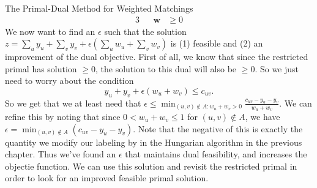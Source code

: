 \begin{section}{The Primal-Dual Method for Weighted Matchings}
\begin{alignat}{3}
				     && \mathbf{w} & \geq 0
	\end{alignat}
	We now want to find an $\epsilon$ such that the solution $z = \sum_u y_u + \sum_v y_v + 
	\epsilon (\sum_u w_u + \sum_v w_v)$ is (1) feasible and (2) an improvement of the dual 
	objective. First of all, we know that since the restricted primal has solution $\geq 0$, 
	the solution to this dual will also be $\geq 0$. So we just need to worry about the condition 
	\[
		y_u + y_v + \epsilon (w_u + w_v) \leq c_{uv}.
	\]
	So we get that we at least need that $\epsilon \leq \min_{(u,v)\notin A: w_u + w_v > 0}
	\frac{c_{uv} - y_u - y_v}{w_u + w_v}$. We can refine this by noting that since 
	$0 < w_u + w_v \leq 1$ for $(u,v)\notin A$, we have $\epsilon = \min_{(u,v)\notin A} 
	(c_{uv} - y_u - y_v)$. Note that the negative of this is exactly the quantity we modify our 
	labeling by in the Hungarian algorithm in the previous chapter. Thus we've found an 
	$\epsilon$ that maintains dual feasibility, and increases the objectie function. We can use 
	this solution and revisit the restricted primal in order to look for an improved feasible 
	primal solution.
\end{section}

